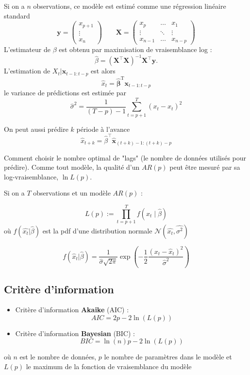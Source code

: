 \documentclass[12pt,a4paper]{article}
\begin{document}
Si on a $n$ observations, ce modèle est estimé comme une régression linéaire standard
$$\mathbf{y} = \begin{pmatrix} x_{p+1} \\ \vdots \\ x_n \end{pmatrix} \qquad \mathbf{X} = \begin{pmatrix} x_p & \dots & x_1 \\ \vdots & \ddots & \vdots \\ x_{n-1} & \dots & x_{n-p} \end{pmatrix}$$
L'estimateur de $\beta$ est obtenu par maximisation de vraisemblance log :
$$\hat{\beta} = (\mathbf{X}^{\top}\mathbf{X})^{-1}\mathbf{X}^{\top}\mathbf{y}.$$
L'estimation de $X_t|\mathbf{x}_{t-1:t-p}$ est alors
$$\widehat{x}_t = \widehat{\boldsymbol{\beta}}^{\text{T}} \mathbf{x}_{t-1:t-p}$$
le variance de prédictions est estimée par
$$\widehat{\sigma}^2 = \frac{1}{(T-p)-1} \sum_{t=p+1}^{T} (x_t - \widehat{x}_t)^2$$

\medskip

On peut aussi prédire $k$ période à l'avance
$$\hat{x}_{t+k} = \hat{\beta}^\top \hat{\mathbf{x}}_{(t+k)-1:(t+k)-p}$$

Comment choisir le nombre optimal de "lags" (le nombre de données utilisés pour prédire). Comme tout modèle, la qualité d'un $AR(p)$ peut être mesuré par sa log-vraisemblance, $\ln L(p)$.

Si on a $T$ observations et un modèle $AR(p)$ :

$$L(p) := \prod_{t=p+1}^{T} f\left(x_t \mid \hat{\beta}\right)$$
où $f(\hat{x_t} | \hat{\beta})$ est la pdf d'une distribution normale $\mathcal{N} (\hat{x_t}, \hat{\sigma^2})$

$$f(\hat{x}_t | \hat{\beta}) = \frac{1}{\hat{\sigma}\sqrt{2\pi}} \exp\left( -\frac{1}{2} \frac{(x_t - \hat{x}_t)^2}{\hat{\sigma}^2} \right)$$

\subsection{Critère d'information}

\begin{itemize}
    \item Critère d'information \textbf{Akaike} (AIC) :
    $$AIC = 2p - 2\ln(L(p))$$
    \item Critère d'information \textbf{Bayesian} (BIC) :
    $$BIC = \ln(n)p - 2\ln(L(p))$$
\end{itemize}
où $n$ est le nombre de données, $p$ le nombre de paramètres dans le modèle et $L(p)$ le maximum de la fonction de vraisemblance du modèle
\end{document}
